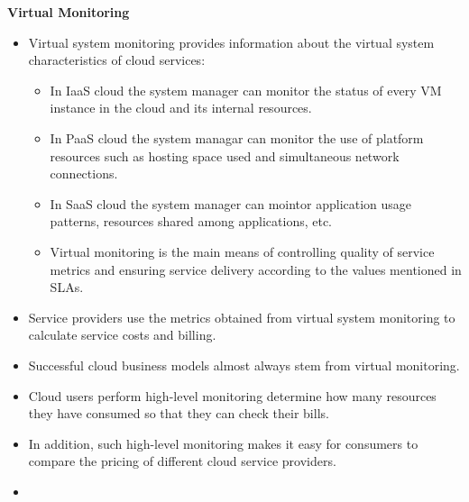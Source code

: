 \documentclass[a4paper, 12pt]{article}
\begin{document}
\textbf{Virtual Monitoring}
\begin{itemize}
\item
Virtual system monitoring provides information about the virtual system characteristics of cloud services:
\begin{itemize}
\item
In IaaS cloud the system manager can monitor the status of every VM instance in the cloud and its internal resources. 
\item
In PaaS cloud the system managar can monitor the use of platform resources such as hosting space used and simultaneous network connections.
\item
In SaaS cloud the system manager can mointor application usage patterns, resources shared among applications, etc.
\item
Virtual monitoring is the main means of controlling quality of service metrics and ensuring service delivery according to the values mentioned in SLAs.
\end{itemize}
\item
Service providers use the metrics obtained from virtual system monitoring to calculate service costs and billing.
\item
Successful cloud business models almost always stem from virtual monitoring.
\item
Cloud users perform high-level monitoring determine how many resources they have consumed so that they can check their bills.
\item
In addition, such high-level monitoring makes it easy for consumers to compare the pricing of different cloud service providers.
\item

\end{itemize}
\end{document}
